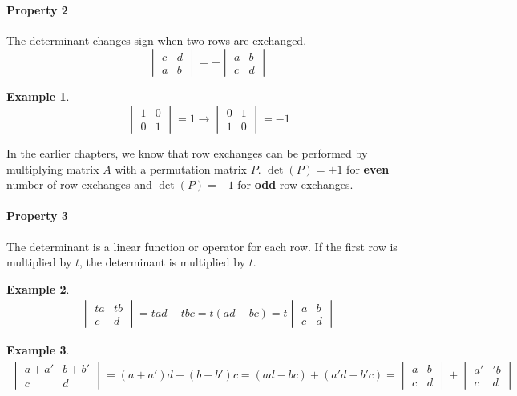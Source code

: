 \documentclass[12pt, letterpaper]{article}
\newcommand{\DefinitionSpace}{\vspace{15px}}
\theoremstyle{definition}
\newtheorem{example}{Example}
\begin{document}
\paragraph{Property 2}
The determinant changes sign when two rows are exchanged.
	\[\begin{vmatrix}
		c & d\\
		a & b
	 \end{vmatrix} = - \begin{vmatrix}
						 a & b \\
						 c & d
						 \end{vmatrix}\]
	\begin{example}
		\[
		\begin{vmatrix}
		1 & 0 \\
		0 & 1
		\end{vmatrix} = 1 \rightarrow \begin{vmatrix}
										0 & 1 \\
										1 & 0
										\end{vmatrix} = -1
										\]
	\end{example}
	In the earlier chapters, we know that row exchanges can be performed by multiplying matrix $A$ with a permutation matrix $P$. $\det(P) = +1$ for \textbf{even} number of row exchanges and $\det(P) = -1$ for \textbf{odd} row exchanges.
	
\DefinitionSpace
\paragraph{Property 3}
The determinant is a linear function or operator for each row. If the first row is multiplied by $t$, the determinant is multiplied by $t$.
	\begin{example}
		\begin{gather*}
			\begin{vmatrix}
				ta & tb \\
				c & d		
			\end{vmatrix} = tad - tbc = t(ad - bc) = t \begin{vmatrix}
														a & b \\
														c & d		
														\end{vmatrix}
		\end{gather*}
	\end{example}
	
	
	\begin{example}
		\begin{gather*}
			\begin{vmatrix}
				a+a' & b+b' \\
				c & d		
			\end{vmatrix} = (a+a')d - (b+b')c = (ad-bc) + (a'd - b'c) = \begin{vmatrix}
																			a & b \\
																			c & d		
																			\end{vmatrix} + \begin{vmatrix}
																								a' & 'b \\
																								c & d		
																								\end{vmatrix}
		\end{gather*}
	\end{example}
\end{document}
